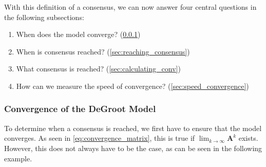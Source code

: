 \documentclass[journal,compsoc,10pt]{IEEEtran}
\renewcommand{\vec}[1]{\bm{#1}}        %
\newcommand{\mat}[1]{\bm{#1}}          %
\begin{document}

With this definition of a consensus, we can now answer four central questions in the following subsections:
\begin{enumerate}
    \item When does the model converge? (\cref{sec:when_convergence})
    \item When is consensus reached? (\cref{sec:reaching_consensus})
    \item What consensus is reached? (\cref{sec:calculating_conv})
    \item How can we measure the speed of convergence? (\cref{sec:speed_convergence})
\end{enumerate}

\subsubsection{Convergence of the DeGroot Model}\label{sec:when_convergence}
To determine when a consensus is reached, we first have to ensure that the model converges. As seen in \cref{eq:convergence_matrix}, this is true if $\lim_{k\rightarrow\infty}\mat A^k$ exists. However, this does not always have to be the case, as can be seen in the following example.
\end{document}
